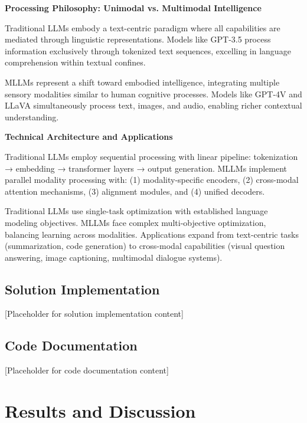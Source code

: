 \documentclass[12pt,a4paper]{article}
\begin{document}
\textbf{Processing Philosophy: Unimodal vs. Multimodal Intelligence}

Traditional LLMs embody a text-centric paradigm where all capabilities are mediated through linguistic representations. Models like GPT-3.5 process information exclusively through tokenized text sequences, excelling in language comprehension within textual confines.

MLLMs represent a shift toward embodied intelligence, integrating multiple sensory modalities similar to human cognitive processes. Models like GPT-4V and LLaVA simultaneously process text, images, and audio, enabling richer contextual understanding.

\textbf{Technical Architecture and Applications}

Traditional LLMs employ sequential processing with linear pipeline: tokenization → embedding → transformer layers → output generation. MLLMs implement parallel modality processing with: (1) modality-specific encoders, (2) cross-modal attention mechanisms, (3) alignment modules, and (4) unified decoders.

Traditional LLMs use single-task optimization with established language modeling objectives. MLLMs face complex multi-objective optimization, balancing learning across modalities. Applications expand from text-centric tasks (summarization, code generation) to cross-modal capabilities (visual question answering, image captioning, multimodal dialogue systems).


\subsection{Solution Implementation}


[Placeholder for solution implementation content]

\subsection{Code Documentation}


[Placeholder for code documentation content]

\section{Results and Discussion}
\end{document}
